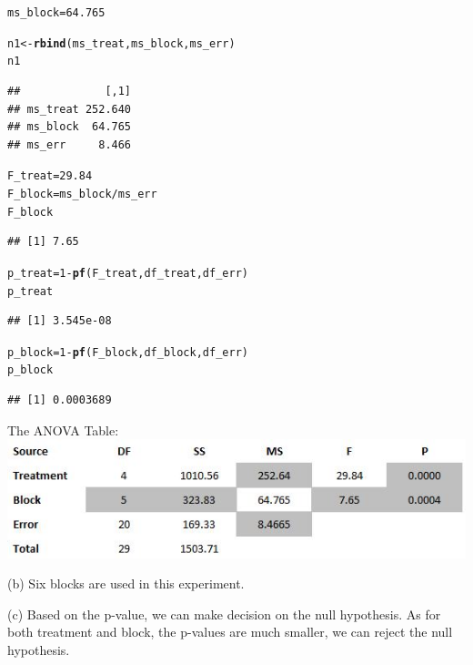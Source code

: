\documentclass[a4paper]{article}\usepackage{graphicx, color}
\makeatletter
\newcommand{\hlfunctioncall}[1]{\textcolor[rgb]{0.501960784313725,0,0.329411764705882}{\textbf{#1}}}%
\newenvironment{kframe}{%
 \def\at@end@of@kframe{}%
 \ifinner\ifhmode%
  \def\at@end@of@kframe{\end{minipage}}%
  \begin{minipage}{\columnwidth}%
 \fi\fi%
 \def\FrameCommand##1{\hskip\@totalleftmargin \hskip-\fboxsep
 \colorbox{shadecolor}{##1}\hskip-\fboxsep
     \hskip-\linewidth \hskip-\@totalleftmargin \hskip\columnwidth}%
 \MakeFramed {\advance\hsize-\width
   \@totalleftmargin\z@ \linewidth\hsize
   \@setminipage}}%
 {\par\unskip\endMakeFramed%
 \at@end@of@kframe}
\newenvironment{knitrout}{}{} %
\makeatother
\begin{document}
\begin{knitrout}
\begin{kframe}
\begin{alltt}
ms_block = 64.765

n1 <- \hlfunctioncall{rbind}(ms_treat, ms_block, ms_err)
n1
\end{alltt}
\begin{verbatim}
##             [,1]
## ms_treat 252.640
## ms_block  64.765
## ms_err     8.466
\end{verbatim}
\begin{alltt}

F_treat = 29.84
F_block = ms_block/ms_err
F_block
\end{alltt}
\begin{verbatim}
## [1] 7.65
\end{verbatim}
\begin{alltt}

p_treat = 1 - \hlfunctioncall{pf}(F_treat, df_treat, df_err)
p_treat
\end{alltt}
\begin{verbatim}
## [1] 3.545e-08
\end{verbatim}
\begin{alltt}

p_block = 1 - \hlfunctioncall{pf}(F_block, df_block, df_err)
p_block
\end{alltt}
\begin{verbatim}
## [1] 0.0003689
\end{verbatim}
\end{kframe}
\end{knitrout}


\vspace{3 mm}
\raggedright{The ANOVA Table:}\\
\vspace{2 mm}
\includegraphics[width=140mm]{fig1.jpg}

\vspace{2 mm}


\raggedright{(b)}
\vspace{2 mm}
Six blocks are used in this experiment.\\
\vspace{2 mm}

(c)
Based on the p-value, we can make decision on the null hypothesis. As for both treatment and block, the p-values are much smaller, we can reject the null hypothesis. \\
\end{document}
